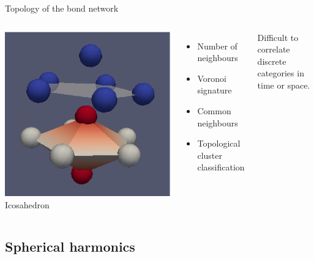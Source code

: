 \begin{frame}{Topology of the bond network}
\begin{columns}
	\bigskip
	\includegraphics[width=\columnwidth]{ico_13_1551}\\
	Icosahedron
	\begin{itemize}
		\item Number of neighbours
		\item Voronoi signature \citep{tanemura1977geometrical}
		\item Common neighbours \citep{Honeycutt1987}
		\item Topological cluster classification \citep{Williams2007}
	\end{itemize}
	Difficult to correlate discrete categories in time or space.
	\end{columns}
\end{frame}

\subsection{Spherical harmonics}

